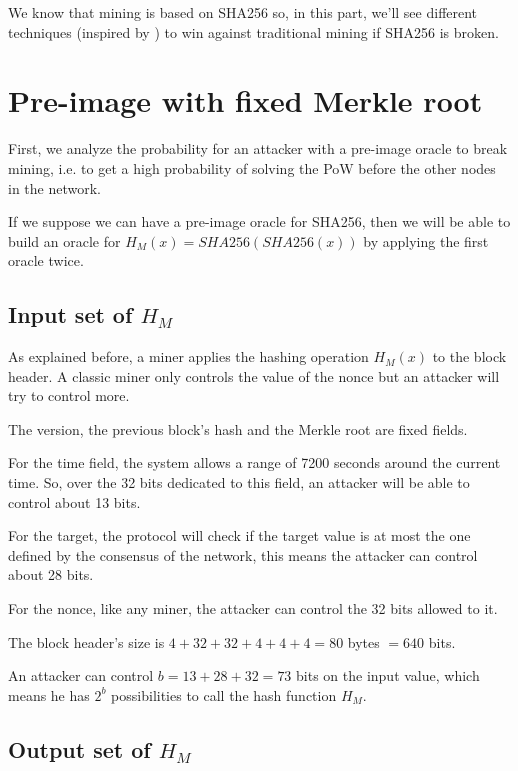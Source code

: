 We know that mining is based on SHA256 so, in this part, we'll see different techniques (inspired by \cite{broken_crypto_primitives}) to win against traditional mining if SHA256 is broken.

\section{Pre-image with fixed Merkle root}

First, we analyze the probability for an attacker with a pre-image oracle to break mining, i.e. to get a high probability of solving the PoW before the other nodes in the network.

If we suppose we can have a pre-image oracle for SHA256, then we will be able to build an oracle for $H_M(x) = SHA256(SHA256(x))$ by applying the first oracle twice.

	\subsection{Input set of $H_M$}

As explained before, a miner applies the hashing operation $H_M(x)$ to the block header. A classic miner only controls the value of the nonce but an attacker will try to control more. \newline

The version, the previous block's hash and the Merkle root are fixed fields. \newline

For the time field, the system allows a range of 7200 seconds around the current time. So, over the 32 bits dedicated to this field, an attacker will be able to control about 13 bits.

For the target, the protocol will check if the target value is at most the one defined by the consensus of the network, this means the attacker can control about 28 bits.

For the nonce, like any miner, the attacker can control the 32 bits allowed to it. \newline

The block header's size is $4 + 32 + 32 + 4 + 4 + 4 = 80$ bytes $ = 640$ bits.

An attacker can control $b = 13 + 28 + 32 = 73$ bits on the input value, which means he has $2^b$ possibilities to call the hash function $H_M$.

	\subsection{Output set of $H_M$}

